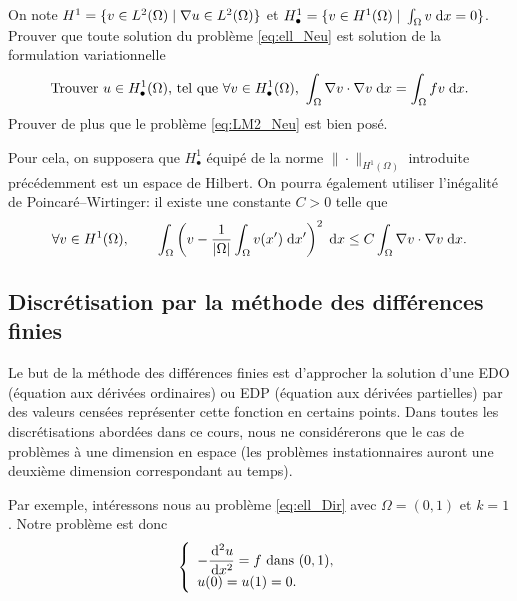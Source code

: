 \documentclass[12pt,a4paper,twoside]{article}
\begin{document}
\begin{exercise}
  On note $H^1 = \{ v \in L^2(\Omega) \; | \; \nabla u \in L^2(\Omega) \}$
  et $H_{\bullet}^1 = \{ v \in H^1(\Omega) \; | \; \int_{\Omega} v \;\mathrm{d} x = 0 \}$.
  Prouver que toute solution du probl\`eme \eqref{eq:ell_Neu}
  est solution de la formulation variationnelle
  \begin{align}
    \label{eq:LM2_Neu}
    \text{Trouver $u \in H_{\bullet}^1(\Omega)$, tel que $\forall v \in H_{\bullet}^1(\Omega)$, } 
    \int_{\Omega} \nabla v \cdot \nabla v \;\mathrm{d} x = \int_{\Omega} f v \;\mathrm{d} x .
  \end{align}
  Prouver de plus que le probl\`eme \eqref{eq:LM2_Neu} est bien pos\'e.

  Pour cela, on supposera que $H_{\bullet}^1$ \'equip\'e de la norme $\| \cdot \|_{H^1(\Omega)}$
  introduite pr\'ec\'edemment est un espace de Hilbert.
  On pourra \'egalement utiliser l'in\'egalit\'e de Poincar\'e--Wirtinger:
  il existe une constante $C>0$ telle que
  \begin{equation*}
    \forall v \in H^1(\Omega) , \qquad
    \int_{\Omega} \left( v - \dfrac{1}{|\Omega|} \int_{\Omega} v(x') \;\mathrm{d} x' \right)^2
    \;\mathrm{d} x \leq C \int_{\Omega} \nabla v \cdot \nabla v \;\mathrm{d} x .
  \end{equation*}
\end{exercise}
\subsection{Discr\'etisation par la m\'ethode des diff\'erences finies}
\label{subsec:ell_DF}

Le but de la m\'ethode des diff\'erences finies est d'approcher la solution 
d'une EDO (\'equation aux d\'eriv\'ees ordinaires) ou EDP
(\'equation aux d\'eriv\'ees partielles) par des valeurs cens\'ees repr\'esenter
cette fonction en certains points. Dans toutes les discr\'etisations abord\'ees dans ce cours,
nous ne consid\'ererons que le cas de probl\`emes \`a une dimension en espace
(les probl\`emes instationnaires auront une deuxi\`eme dimension correspondant au temps).

Par exemple, int\'eressons nous au probl\`eme \eqref{eq:ell_Dir} avec $\Omega = (0,1)$
et $k = 1$.
Notre probl\`eme est donc
\begin{equation}
  \label{eq:ell_1d}
  \left\{
    \begin{array}{l}
      - \dfrac{\!\;\mathrm{d}^2 u}{\!\;\mathrm{d} x^2} = f \text{ dans } (0,1) ,
      \\
      u(0) = u(1) = 0 .
    \end{array}
  \right.
\end{equation}
\end{document}
